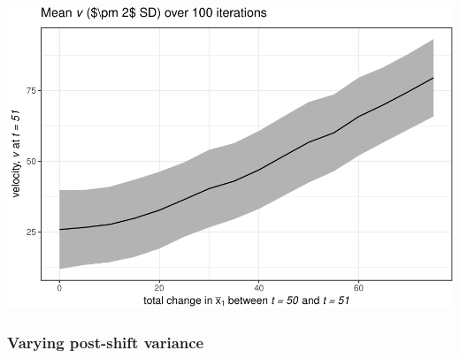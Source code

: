 \documentclass[12pt,twoside,openany]{reedthesis}
\begin{document}
\includegraphics{_myDissertation_files/figure-latex/simVplot2-1.pdf}

\subsubsection{Varying post-shift
variance}\label{varying-post-shift-variance}
\end{document}
